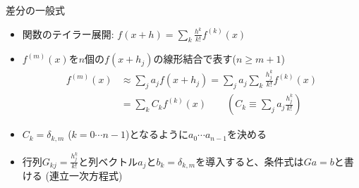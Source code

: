 \begin{frame}[t,fragile]{差分の一般式}
  \begin{itemize}
  \item 関数のテイラー展開: $\displaystyle f(x+h) = \sum_{k} \frac{h^k}{k!} f^{(k)}(x)$
  \item $f^{(m)}(x)$を$n$個の$f(x+h_j)$の線形結合で表す($n \ge m+1$)
    \begin{align*}
      f^{(m)}(x) &\approx \sum_j a_j f(x+h_j) = \sum_j a_j \sum_{k} \frac{h_j^k}{k!} f^{(k)}(x) \\
      & = \sum_{k} C_k f^{(k)}(x) \qquad (C_k \equiv \sum_j a_j \frac{h_j^k}{k!})
    \end{align*}
  \item $C_k = \delta_{k,m}$ ($k = 0 \cdots n-1$)となるように$a_0 \cdots a_{n-1}$を決める
  \item 行列$\displaystyle G_{kj} = \frac{h_j^k}{k!}$と列ベクトル$a_j$と$b_k = \delta_{k,m}$を導入すると、条件式は$G a = b$と書ける (連立一次方程式)
  \end{itemize}
\end{frame}
